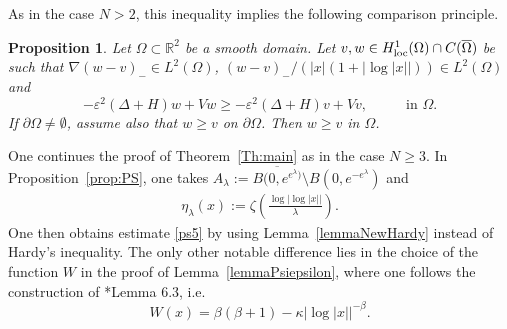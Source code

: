\documentclass[a4paper]{amsart}
\newtheorem{proposition}{Proposition}[section]
\begin{document}
As in the case $N>2$, this inequality implies the following comparison principle.
\begin{proposition}\label{Th:comp2}
Let $\Omega \subset {\mathbb{R}}^2$ be a smooth domain. Let $v,w \in H^1_{\textnormal{loc}}(\Omega)\cap C(\overline{\Omega})$ be such
that $\nabla (w-v)_- \in L^2(\Omega)$, $(w-v)_-/({\left| {x} \right|}(1+\lvert\log {\left| {x} \right|}\rvert)) \in L^2(\Omega)$ and
\[
 - \varepsilon^2 (\Delta + H) w + V w \geq - \varepsilon^2 (\Delta + H) v + V v, \hspace{1cm}  \text{ in } \Omega.
\]
If $\partial\Omega \neq \emptyset$, assume also that $w \geq v$ on $\partial\Omega$. Then $w \geq v$ in $\Omega$.
\end{proposition}

One continues the proof of Theorem~\ref{Th:main} as in the case $N \geq 3$. 
In Proposition~\ref{prop:PS}, one takes $A_{\lambda} := \overline{B(0, e^{e^\lambda)}} 
\setminus B(0, e^{-e^{\lambda}})$ and
 \begin{align*}
  \eta_{\lambda}(x) := \zeta\left( \frac{\log {\left| {\log {\left| {x} \right|}} \right|}}{\lambda} \right).
 \end{align*}
One then obtains estimate \eqref{ps5} by using Lemma~\ref{lemmaNewHardy} instead of Hardy's inequality.
The only other notable difference lies in the choice of the function $W$ in the proof of Lemma~\ref{lemmaPsiepsilon}, 
where one follows the construction of \cite{MVS}*{Lemma 6.3}, i.e.
\[
  W(x)=\beta (\beta+1)-\kappa{\left| {\log {\left| {x} \right|}} \right|}^{-\beta}.
\]
\end{document}
